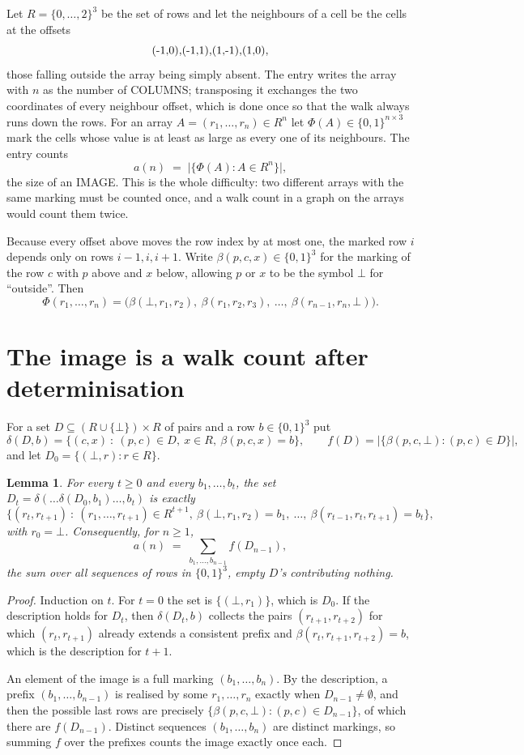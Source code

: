\documentclass[11pt,a4paper]{article}
\theoremstyle{plain}
\newtheorem{lemma}[theorem]{Lemma}
\theoremstyle{definition}
\begin{document}
Let $R=\{0,\dots,2\}^{3}$ be the set of rows and let the neighbours of a cell be the
cells at the offsets
\[
$(-1,0)$, $(-1,1)$, $(1,-1)$, $(1,0)$,
\]
those falling outside the array being simply absent. The entry writes the array with $n$ as the number of COLUMNS; transposing it exchanges the two coordinates of every neighbour offset, which is done once so that the walk always runs down the rows. For an array
$A=(r_1,\dots,r_n)\in R^n$ let $\Phi(A)\in\{0,1\}^{n\times3}$ mark the cells whose value
is at least as large as every one of its neighbours. The entry counts
\[
a(n)\;=\;\bigl|\{\Phi(A):A\in R^n\}\bigr| ,
\]
the size of an IMAGE. This is the whole difficulty: two different arrays with the same marking
must be counted once, and a walk count in a graph on the arrays would count them twice.

Because every offset above moves the row index by at most one, the marked row $i$ depends only
on rows $i-1,i,i+1$. Write $\beta(p,c,x)\in\{0,1\}^{3}$ for the marking of the row $c$
with $p$ above and $x$ below, allowing $p$ or $x$ to be the symbol $\bot$ for ``outside''.
Then
\[
\Phi(r_1,\dots,r_n)=\bigl(\beta(\bot,r_1,r_2),\ \beta(r_1,r_2,r_3),\ \dots,\
\beta(r_{n-1},r_n,\bot)\bigr).
\]

\section{The image is a walk count after determinisation}

For a set $D\subseteq(R\cup\{\bot\})\times R$ of pairs and a row $b\in\{0,1\}^{3}$ put
\[
\delta(D,b)=\{(c,x)\ :\ (p,c)\in D,\ x\in R,\ \beta(p,c,x)=b\},\qquad
f(D)=\bigl|\{\beta(p,c,\bot):(p,c)\in D\}\bigr| ,
\]
and let $D_0=\{(\bot,r):r\in R\}$.

\begin{lemma}\label{lem:det}
For every $t\ge0$ and every $b_1,\dots,b_t$, the set
$D_t=\delta(\dots\delta(D_0,b_1)\dots,b_t)$ is exactly
\[
\{(r_t,r_{t+1})\ :\ (r_1,\dots,r_{t+1})\in R^{t+1},\ \beta(\bot,r_1,r_2)=b_1,\ \dots,\
\beta(r_{t-1},r_t,r_{t+1})=b_t\} ,
\]
with $r_0=\bot$. Consequently, for $n\ge1$,
\[
a(n)\;=\;\sum_{b_1,\dots,b_{n-1}}f(D_{n-1}),
\]
the sum over all sequences of rows in $\{0,1\}^{3}$, empty $D$'s contributing nothing.
\end{lemma}

\begin{proof}
Induction on $t$. For $t=0$ the set is $\{(\bot,r_1)\}$, which is $D_0$. If the description
holds for $D_t$, then $\delta(D_t,b)$ collects the pairs $(r_{t+1},r_{t+2})$ for which
$(r_t,r_{t+1})$ already extends a consistent prefix and
$\beta(r_t,r_{t+1},r_{t+2})=b$, which is the description for $t+1$.

An element of the image is a full marking $(b_1,\dots,b_n)$. By the description, a prefix
$(b_1,\dots,b_{n-1})$ is realised by some $r_1,\dots,r_n$ exactly when $D_{n-1}\neq
\emptyset$, and then the possible last rows are precisely
$\{\beta(p,c,\bot):(p,c)\in D_{n-1}\}$, of which there are $f(D_{n-1})$. Distinct
sequences $(b_1,\dots,b_n)$ are distinct markings, so summing $f$ over the prefixes counts the
image exactly once each.
\end{proof}
\end{document}
